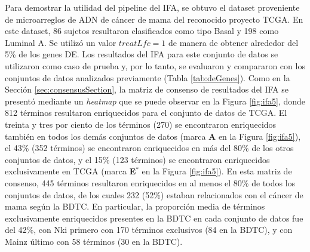 \documentclass[12pt,twoside]{reedthesis}
\begin{document}
\par

Para demostrar la utilidad del pipeline del IFA, se obtuvo el dataset proveniente de microarreglos de ADN de cáncer de mama del reconocido proyecto TCGA. En este dataset, 86 sujetos resultaron clasificados como tipo Basal y 198 como Luminal A. Se utilizó un valor \(treatLfc=1\) de manera de obtener alrededor del 5\% de los genes DE. Los resultados del IFA para este conjunto de datos se utilizaron como caso de prueba y, por lo tanto, se evaluaron y compararon con los conjuntos de datos analizados previamente (Tabla \ref{tab:deGenes}). Como en la Sección \ref{sec:consensusSection}, la matriz de consenso de resultados del IFA se presentó mediante un \emph{heatmap} que se puede observar en la Figura \ref{fig:ifa5}, donde 812 términos resultaron enriquecidos para el conjunto de datos de TCGA. El treinta y tres por ciento de los términos (270) se encontraron enriquecidos también en todos los demás conjuntos de datos (marca \textbf{A} en la Figura \ref{fig:ifa5}), el 43\% (352 términos) se encontraron enriquecidos en más del 80\% de los otros conjuntos de datos, y el 15\% (123 términos) se encontraron enriquecidos exclusivamente en TCGA (marca \textbf{E\(^*\)} en la Figura \ref{fig:ifa5}). En esta matriz de consenso, 445 términos resultaron enriquecidos en al menos el 80\% de todos los conjuntos de datos, de los cuales 232 (52\%) estaban relacionados con el cáncer de mama según la BDTC. En particular, la proporción media de términos exclusivamente enriquecidos presentes en la BDTC en cada conjunto de datos fue del 42\%, con Nki primero con 170 términos exclusivos (84 en la BDTC), y con Mainz último con 58 términos (30 en la BDTC).

\par
\end{document}
